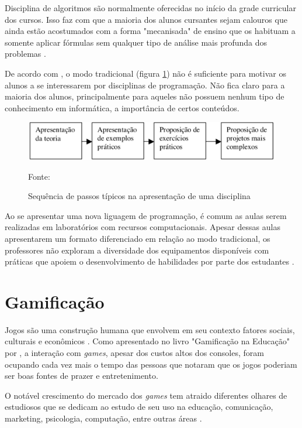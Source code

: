 Disciplina de algoritmos são normalmente oferecidas no início da grade curricular dos cursos. Isso faz com que a maioria dos alunos
cursantes sejam calouros que ainda estão acostumados com a forma "mecanisada" de ensino que os habituam a somente aplicar fórmulas 
sem qualquer tipo de análise mais profunda dos problemas \cite{KOLIVER}.

De acordo com , o modo tradicional (figura \ref{figura4}) não é suficiente para motivar os alunos a se
interessarem por disciplinas de programação. Não fica claro para a maioria dos alunos, principalmente para aqueles
não possuem nenhum tipo de conhecimento em informática, a importância de certos conteúdos.

\begin{figure}[h]
	\centering
	\includegraphics[keepaspectratio=true,scale=0.34]{figuras/modoTradicional.png}
	\caption{Sequência de passos típicos na apresentação de uma disciplina}
	Fonte: \cite{Borges}
	\label{figura4}
\end{figure}

Ao se apresentar uma nova liguagem de programação, é comum as aulas serem realizadas em laboratórios com
recursos computacionais. Apesar dessas aulas apresentarem um formato diferenciado em relação ao modo tradicional,
os professores não exploram a diversidade dos equipamentos disponíveis com práticas que apoiem o desenvolvimento 
de habilidades por parte dos estudantes \cite{Borges}.

\section{Gamificação}
Jogos são uma construção humana que envolvem em seu contexto fatores sociais, culturais e econômicos \cite{EaDF440}.
Como apresentado no livro "Gamificação na Educação" por , a interação com \textit{games}, apesar
dos custos altos dos consoles, foram ocupando cada vez mais o tempo das pessoas que notaram que os jogos poderiam ser boas fontes
de prazer e entretenimento.

O notável crescimento do mercado dos \textit{games} tem atraido diferentes olhares de estudiosos que se dedicam ao estudo de seu
uso na educação, comunicação, marketing, psicologia, computação, entre outras áreas \cite{da2014gamificaccao}.

